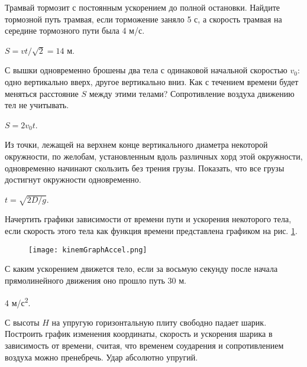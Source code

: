 \begin{ex} %
Трамвай тормозит с постоянным ускорением до полной остановки. Найдите тормозной путь трамвая, если торможение заняло 5 с, а скорость трамвая на середине тормозного пути была 4 м/с.
\begin{ans}
$S = vt/\sqrt{2} = 14$ м.
\end{ans}
\end{ex}

\begin{ex} %
С вышки одновременно брошены два тела с одинаковой начальной скоростью $v_0$: одно вертикально вверх, другое вертикально вниз. Как с течением времени будет меняться расстояние $S$ между этими телами? Сопротивление воздуха движению тел не учитывать.
\begin{ans}
$S = 2 v_0 t$.
\end{ans}
\end{ex}

\begin{ex} %
Из точки, лежащей на верхнем конце вертикального диаметра некоторой окружности, по желобам, установленным вдоль различных хорд этой окружности, одновременно начинают скользить без трения грузы. Показать, что все грузы достигнут окружности одновременно.
\begin{ans}
$t = \sqrt{2D/g}$.
\end{ans}
\end{ex}

\begin{ex} %
Начертить графики зависимости от времени пути и ускорения некоторого тела, если скорость этого тела как функция времени представлена графиком на рис. \ref{kinemGraphAccel}.

\begin{figure}
\centering
\texttt{[image: kinemGraphAccel.png]}
\caption{}
\label{kinemGraphAccel}
\end{figure}
\end{ex}

\begin{ex} %
С каким ускорением движется тело, если за восьмую секунду после начала прямолинейного движения оно прошло путь 30 м.
\begin{ans}
4 м/с\textsuperscript{2}.
\end{ans}
\end{ex}


\begin{ex} %
С высоты $H$ на упругую горизонтальную плиту свободно падает шарик. Построить график изменения координаты, скорость и ускорения шарика в зависимость от времени, считая, что временем соударения и сопротивлением воздуха можно пренебречь. Удар абсолютно упругий.
\end{ex}

